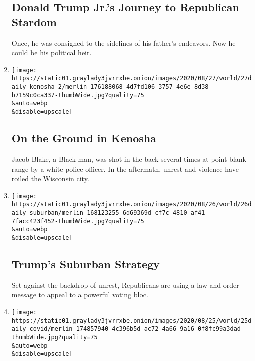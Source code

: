 \begin{enumerate}
{  \subsection{Donald Trump Jr.'s Journey to Republican
  Stardom}\label{donald-trump-jrs-journey-to-republican-stardom}}

  Once, he was consigned to the sidelines of his father's endeavors. Now
  he could be his political heir.
\item
  \href{/2020/08/27/podcasts/the-daily/kenosha-wisconsin-protests.html}{}

  \texttt{[image: https://static01.graylady3jvrrxbe.onion/images/2020/08/27/world/27daily-kenosha-2/merlin\_176188068\_4d7fd106-3757-4e6e-8d38-b7159c0ca337-thumbWide.jpg?quality=75\\\&auto=webp\\\&disable=upscale]}

  \hypertarget{on-the-ground-in-kenosha}{%
  \subsection{On the Ground in Kenosha}\label{on-the-ground-in-kenosha}}

  Jacob Blake, a Black man, was shot in the back several times at
  point-blank range by a white police officer. In the aftermath, unrest
  and violence have roiled the Wisconsin city.
\item
  \href{/2020/08/26/podcasts/the-daily/republican-convention-suburbs.html}{}

  \texttt{[image: https://static01.graylady3jvrrxbe.onion/images/2020/08/26/world/26daily-suburban/merlin\_168123255\_6d69369d-cf7c-4810-af41-7facc423f452-thumbWide.jpg?quality=75\\\&auto=webp\\\&disable=upscale]}

  \hypertarget{trumps-suburban-strategy}{%
  \subsection{Trump's Suburban
  Strategy}\label{trumps-suburban-strategy}}

  Set against the backdrop of unrest, Republicans are using a law and
  order message to appeal to a powerful voting bloc.
\item
  \href{/2020/08/25/podcasts/the-daily/coronavirus-plasma-reinfection.html}{}

  \texttt{[image: https://static01.graylady3jvrrxbe.onion/images/2020/08/25/world/25daily-covid/merlin\_174857940\_4c396b5d-ac72-4a66-9a16-0f8fc99a3dad-thumbWide.jpg?quality=75\\\&auto=webp\\\&disable=upscale]}


\end{enumerate}
